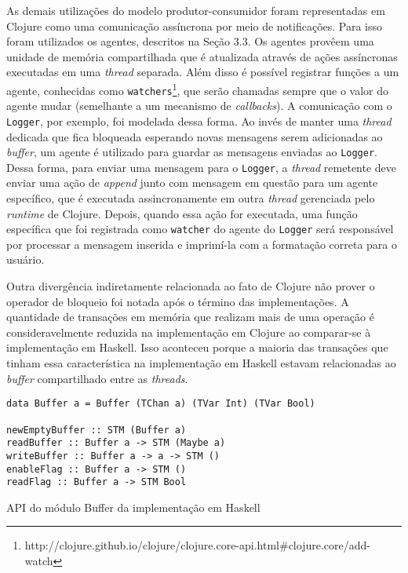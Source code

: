 As demais utilizações do modelo produtor-consumidor foram representadas em Clojure como uma comunicação assíncrona por meio de notificações. Para isso foram utilizados os agentes, descritos na Seção 3.3. Os agentes provêem uma unidade de memória compartilhada que é atualizada através de ações assíncronas executadas em uma \emph{thread} separada. Além disso é possível registrar funções a um agente, conhecidas como \verb|watchers|\footnote{http://clojure.github.io/clojure/clojure.core-api.html\#clojure.core/add-watch}, que serão chamadas sempre que o valor do agente mudar (semelhante a um mecanismo de \emph{callbacks}). A comunicação com o \verb|Logger|, por exemplo, foi modelada dessa forma. Ao invés de manter uma \emph{thread} dedicada que fica bloqueada esperando novas mensagens serem adicionadas ao \emph{buffer}, um agente é utilizado para guardar as mensagens enviadas ao \verb|Logger|. Dessa forma, para enviar uma mensagem para o \verb|Logger|, a \emph{thread} remetente deve enviar uma ação de \emph{append} junto com mensagem em questão para um agente específico, que é executada assincronamente em outra \emph{thread} gerenciada pelo \emph{runtime} de Clojure. Depois, quando essa ação for executada, uma função específica que foi registrada como \verb|watcher| do agente do \verb|Logger| será responsável por processar a mensagem inserida e imprimí-la com a formatação correta para o usuário.

Outra divergência indiretamente relacionada ao fato de Clojure não prover o operador de bloqueio foi notada após o término das implementações. A quantidade de transações em memória que realizam mais de uma operação é consideravelmente reduzida na implementação em Clojure ao comparar-se à implementação em Haskell. Isso aconteceu porque a maioria das transações que tinham essa característica na implementação em Haskell estavam relacionadas ao \emph{buffer} compartilhado entre as \emph{threads}. 

\begin{listing}[h]
  \begin{verbatim}
data Buffer a = Buffer (TChan a) (TVar Int) (TVar Bool)

newEmptyBuffer :: STM (Buffer a)
readBuffer :: Buffer a -> STM (Maybe a)
writeBuffer :: Buffer a -> a -> STM ()
enableFlag :: Buffer a -> STM ()
readFlag :: Buffer a -> STM Bool
  \end{verbatim}
  \caption{API do módulo Buffer da implementação em Haskell}
  \label{code:buffer-api}
\end{listing}

